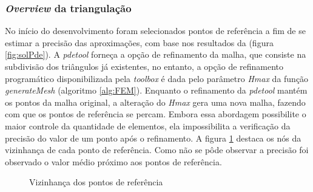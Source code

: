 \documentclass[
    12pt,               %
    openright,          %
    oneside,
    a4paper,            %
    english,            %
    french,             %
    spanish,            %
    brazil              %
    ]{abntex2}
\begin{document}
\subsubsection*{\textit{Overview} da triangulação}
No início do desenvolvimento foram selecionados pontos de referência a fim de se estimar a precisão das aproximações, com base nos resultados da  (figura \ref{fig:solPde}).
A \textit{pdetool} forneça a opção de refinamento da malha, que consiste na subdivisão dos triângulos já existentes, no entanto, a opção de refinamento programático disponibilizada pela \textit{toolbox} é dada pelo parâmetro \textit{Hmax} da função \textit{generateMesh} (algoritmo \ref{alg:FEM}). Enquanto o refinamento da \textit{pdetool} mantém os pontos da malha original, a alteração do \textit{Hmax} gera uma nova malha, fazendo com que os pontos de referência se percam. Embora essa abordagem possibilite o maior controle da quantidade de elementos, ela impossibilita a verificação da precisão do valor de um ponto após o refinamento. A figura \ref{fig:vizinha} destaca os nós da vizinhança de cada ponto de referência. Como não se pôde observar a precisão foi observado o valor médio próximo aos pontos de referência. 

\begin{figure}%
	\centering	
	\qquad
	\caption{Vizinhança dos pontos de referência}%
	\label{fig:vizinha}%
\end{figure}
\end{document}
